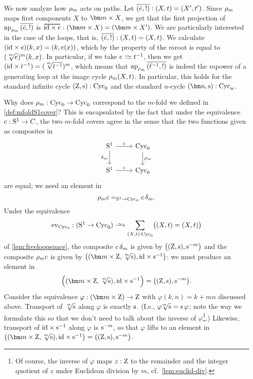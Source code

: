 We now analyze how $\rho_{m}$ acts on paths.
Let $\overline{({\bar {e}},{!})}:(X,t)=(X',t')$.
Since $\rho_{m}$ maps first components $X$ to $\bn m\times X$, we get that
the first projection of $\ap{\cdg{m}}\pathpair{\etop{e}}{!}$ is
$\overetop{\id\times e} : (\bn m\times X) = (\bn m\times X')$.
We are particularly interested in the case of the loops,
that is, $\overline{({\bar {e}},{!})}:(X,t)=(X,t)$.
We calculate $(\mathord{\mathrm{id}}\times e)(k,x) = (k,e(x))$,
which by the property of the $m$\th root is equal to $(\sqrt[\uproot{2}m]e)^m(k,x)$.
In particular, if we take $e\defeq t^{-1}$,
then we get $(\id\times t^{-1}) = (\sqrt[\uproot{2}m]{t^{-1}})^m$, which means that
$\ap{\cdg{m}}\pathpair{\etop{t}^{-1}}{!}$ is indeed the $m$\th power of a
generating loop at the image cycle $\rho_{m}(X,t)$.
In particular, this holds for the standard infinite cycle $(\zet,\zs):\Cyc_0$
and the standard $n$-cycle $(\bn n,\zs):\Cyc_n$.

Why does $\rho_{m}:\mathrm{Cyc}_0\to\mathrm{Cyc}_0$
correspond to the $m$-fold \covering we defined in \cref{def:mfoldS1cover}?
This is encapsulated by the fact that under the equivalence $c:{\mathrm{S}^1}\to C$, the two $m$-fold covers agree in the sense that the two functions given as composites in
\[
  \begin{tikzcd}
    \Sc\ar[r,"c"]\ar[d,"\dg{m}"'] & \Cyc_0\ar[d,"\cdg{m}"] \\
    \Sc\ar[r,"c"] & \Cyc_0
  \end{tikzcd}
\]
are equal; we need an element in
\[
  \rho_{m}c=_{{\mathrm{S}^1}\to\mathrm{Cyc}_0}c\,\delta_{m}.
\]
Under the equivalence
\[
  \ev_{\Cyc_0}:(\Sc\to\Cyc_0)\we \sum_{(X,t):\Cyc_0}\bigl((X,t)=(X,t)\bigr)
\]
of \cref{lem:freeloopspace},
the composite $c\,\delta_{m}$ is given by $\bigl((\zet,\zs),\zs^{-m}\bigr)$
and the composite $\rho_{m}c$ is given by
$\bigl((\bn m\times\zet,\sqrt[\uproot{2}m]{\zs}),\id\times\zs^{-1}\bigr)$:
we must produce an element in
\[
  \Bigl((\bn m\times\zet,\sqrt[\uproot{2}m]{\zs}),\id\times\zs^{-1}\Bigr)
  = \bigl((\zet,\zs),\zs^{-m}\bigr).
\]
Consider the equivalence  $\varphi: (\bn m\times \zet)\to\zet$ with $\varphi(k,n)=k+mn$ discussed above.
Transport of $\sqrt[\uproot{2}m]\zs$ along $\varphi$ is exactly $\zs$.
(I.e., $\varphi\!\sqrt[\uproot{2}m]\zs=\zs\varphi$;
note the way we formulate this so that we don't need to talk about the inverse of $\varphi$\footnote{%
  Of course, the inverse of $\varphi$ maps $z:\mathrm{Z}$ to the remainder and the integer quotient of $z$ under Euclidean division by $m$, cf.~\cref{lem:euclid-div}.}.)
Likewise, transport of $\id\times\zs^{-1}$ along $\varphi$ is $\zs^{-m}$,
so that $\varphi$ lifts to an element in
$\bigl((\bn m\times\zet,\sqrt[\uproot{2}m]{\zs}), \id\times\zs^{-1}\bigr)
= \bigl((\zet,\zs),\zs^{-m}\bigr)$.


